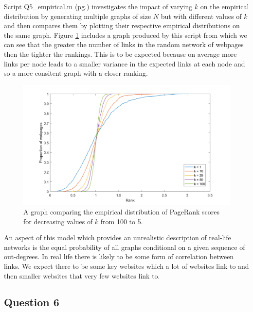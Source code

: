 \documentclass[a4paper]{article}
\begin{document}
\bigskip
Script Q5\_empirical.m (pg.\pageref{PQ5emp}) investigates the impact of varying $k$ on the empirical distribution by generating multiple graphs of size $N$ but with different values of $k$ and then compares them by plotting their respective empirical distributions on the same graph. Figure \ref{fig:q5b} includes a graph produced by this script from which we can see that the greater the number of links in the random network of webpages then the tighter the rankings. This is to be expected because on average more links per node leads to a smaller variance in the expected links at each node and so a more consitent graph with a closer ranking. 
\begin{figure}[H]
    \centering
    \includegraphics[width=1\columnwidth]{q5empirical.png}
    \caption{A graph comparing the empirical distribution of PageRank scores for decreasing values of $k$ from 100 to 5.}
    \label{fig:q5b}
\end{figure}

\bigskip
An aspect of this model which provides an unrealistic description of real-life networks is the equal probability of all graphs conditional on a given sequence of out-degrees. In real life there is likely to be some form of correlation between links. We expect there to be some key websites which a lot of websites link to and then smaller websites that very few websites link to.

\subsection*{Question 6}
\end{document}
